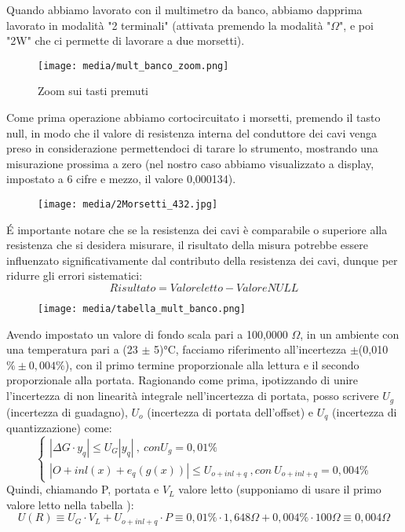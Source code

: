 Quando abbiamo lavorato con il multimetro da banco, abbiamo dapprima lavorato in modalità "2 terminali" (attivata premendo la modalità "$\Omega$", e poi "2W" che ci permette di lavorare a due morsetti).

\begin{figure}[h]
    \centering
    \texttt{[image: media/mult\_banco\_zoom.png]}
    \caption{Zoom sui tasti premuti}
    \label{fig:mult_banco_zoom}
\end{figure}

Come prima operazione abbiamo cortocircuitato i morsetti, premendo il tasto null, in modo che il valore di resistenza interna del conduttore dei cavi venga preso in considerazione permettendoci di tarare lo strumento, mostrando una misurazione prossima a zero (nel nostro caso abbiamo visualizzato a display, impostato a 6 cifre e mezzo, il valore 0,000134).


\begin{figure}[h]
    \centering
    \texttt{[image: media/2Morsetti\_432.jpg]}
    \label{fig:2morsetti}
\end{figure}

\'E importante notare che se la resistenza dei cavi è comparabile o superiore alla resistenza che si desidera misurare, il risultato della misura potrebbe essere influenzato significativamente dal contributo della resistenza dei cavi, dunque per ridurre gli errori sistematici:
\begin{equation}
    Risultato = Valore letto - Valore NULL
\end{equation}

\begin{figure}[h]
    \centering
    \texttt{[image: media/tabella\_mult\_banco.png]}
    \label{fig:tab_mult_banco}
\end{figure}

Avendo impostato un valore di fondo scala pari a 100,0000 $\Omega$, in un ambiente con una temperatura pari a (23 $\pm$ 5)°C, facciamo riferimento all'incertezza $\pm$(0,010 $\% \pm 0,004 \%$), con il primo termine proporzionale alla lettura e il secondo proporzionale alla portata.
Ragionando come prima, ipotizzando di unire l'incertezza di non linearità integrale nell'incertezza di portata, posso scrivere $U_g$ (incertezza di guadagno), $U_o$ (incertezza di portata dell'offset) e $U_q$ (incertezza di quantizzazione) come: 
\begin{equation}
\left\{\begin{array}{l}
| \Delta G \cdot y_q | \leq U_G |y_q| \ , \ con U_g=0,01\% \\ 
| O + inl(x) + e_q(g(x)) | \leq U_{o+inl+q} \ , con \ U_{o+inl+q}=0,004\%
\end{array}\right.
\end{equation}
Quindi, chiamando P, portata e $V_L$ valore letto (supponiamo di usare il primo valore letto nella tabella \label{mult_port}):
\begin{equation}
    U(R) \equiv U_G \cdot V_L + U_{o+inl+q} \cdot P \equiv 0,01\% \cdot 1,648\Omega + 0,004 \% \cdot 100 \Omega \equiv 0,004 \Omega 
\end{equation}

